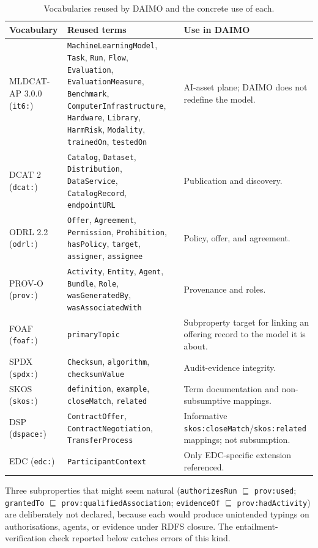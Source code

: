\documentclass[Afour,sagev,times]{sagej}
\newcommand{\code}[1]{\texttt{#1}}
\begin{document}
\begin{table}[t]
\small\sf\centering
\caption{Vocabularies reused by DAIMO and the concrete use of each.\label{tab:reuse}}
\begin{tabular}{@{}p{2.6cm}p{5cm}p{7cm}@{}}
\toprule
\textbf{Vocabulary} & \textbf{Reused terms} & \textbf{Use in DAIMO} \\
\midrule
MLDCAT-AP 3.0.0 (\code{it6:}) & \code{MachineLearningModel}, \code{Task}, \code{Run}, \code{Flow}, \code{Evaluation}, \code{EvaluationMeasure}, \code{Benchmark}, \code{ComputerInfrastructure}, \code{Hardware}, \code{Library}, \code{HarmRisk}, \code{Modality}, \code{trainedOn}, \code{testedOn} & AI-asset plane; DAIMO does not redefine the model. \\
DCAT 2 (\code{dcat:}) & \code{Catalog}, \code{Dataset}, \code{Distribution}, \code{DataService}, \code{CatalogRecord}, \code{endpointURL} & Publication and discovery. \\
ODRL 2.2 (\code{odrl:}) & \code{Offer}, \code{Agreement}, \code{Permission}, \code{Prohibition}, \code{hasPolicy}, \code{target}, \code{assigner}, \code{assignee} & Policy, offer, and agreement. \\
PROV-O (\code{prov:}) & \code{Activity}, \code{Entity}, \code{Agent}, \code{Bundle}, \code{Role}, \code{wasGeneratedBy}, \code{wasAssociatedWith} & Provenance and roles. \\
FOAF (\code{foaf:})~\cite{foaf} & \code{primaryTopic} & Subproperty target for linking an offering record to the model it is about. \\
SPDX (\code{spdx:})~\cite{spdx} & \code{Checksum}, \code{algorithm}, \code{checksumValue} & Audit-evidence integrity. \\
SKOS (\code{skos:})~\cite{skos} & \code{definition}, \code{example}, \code{closeMatch}, \code{related} & Term documentation and non-subsumptive mappings. \\
DSP (\code{dspace:}) & \code{ContractOffer}, \code{ContractNegotiation}, \code{TransferProcess} & Informative \code{skos:closeMatch}/\code{skos:related} mappings; not subsumption. \\
EDC (\code{edc:}) & \code{ParticipantContext} & Only EDC-specific extension referenced. \\
\bottomrule
\end{tabular}
\end{table}

Three subproperties that might seem natural (\code{authorizesRun} $\sqsubseteq$ \code{prov:used}; \code{grantedTo} $\sqsubseteq$ \code{prov:qualifiedAssociation}; \code{evidenceOf} $\sqsubseteq$ \code{prov:hadActivity}) are deliberately not declared, because each would produce unintended typings on authorisations, agents, or evidence under RDFS closure. The entailment-verification check reported below catches errors of this kind.
\end{document}
